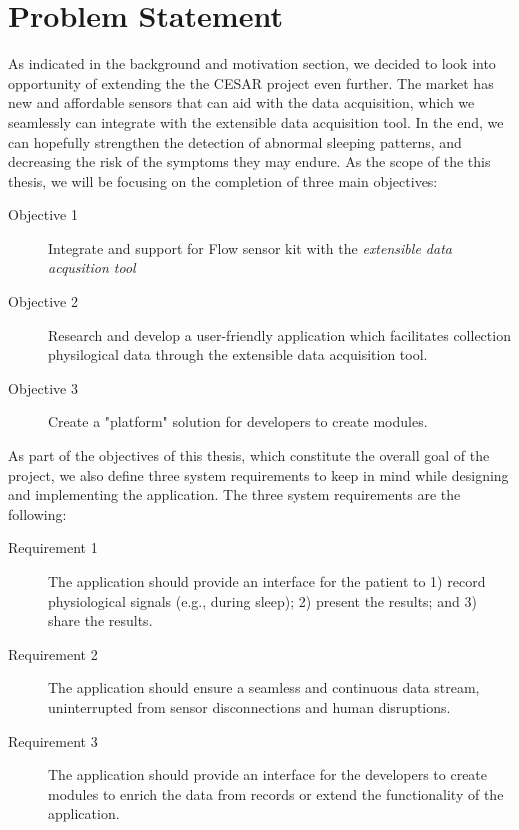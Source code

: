 \section{Problem Statement}

As indicated in the background and motivation section, we decided to look into opportunity of extending the the CESAR project even further. The market has new and affordable sensors that can aid with the data acquisition, which we seamlessly can integrate with the extensible data acquisition tool. In the end, we can hopefully strengthen the detection of abnormal sleeping patterns, and decreasing the risk of the symptoms they may endure. As the scope of the this thesis, we will be focusing on the completion of three main objectives:

\begin{description}
    \item[Objective 1] Integrate and support for Flow sensor kit with the \textit{extensible data acqusition tool}
    \item[Objective 2] Research and develop a user-friendly application which facilitates collection physilogical data through the extensible data acquisition tool.
    \item[Objective 3] Create a "platform" solution for developers to create modules. 
\end{description}

As part of the objectives of this thesis, which constitute the overall goal of the project, we also define three system requirements to keep in mind while designing and implementing the application. The three system requirements are the following: 

\begin{description}
    \item[Requirement 1] The application should provide an interface for the patient to 1) record physiological signals (e.g., during sleep); 2) present the results; and 3) share the results.
    \item[Requirement 2] The application should ensure a seamless and continuous data stream, uninterrupted from sensor disconnections and human disruptions.
    \item[Requirement 3] The application should provide an interface for the developers to create modules to enrich the data from records or extend the functionality of the application.
\end{description}
